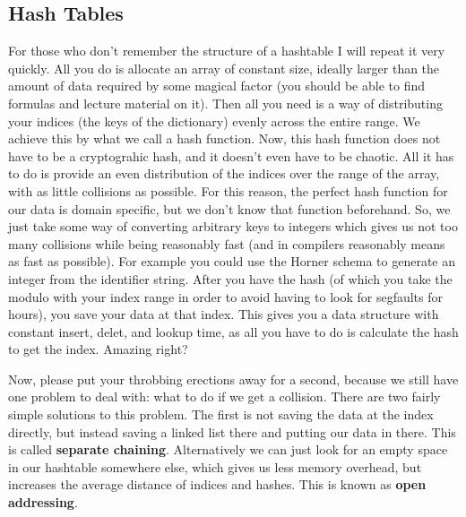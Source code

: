 \documentclass{article}
\begin{document}
\subsection{Hash Tables}
For those who don't remember the structure of a hashtable I will repeat it very quickly.
All you do is allocate an array of constant size, ideally larger than the amount of data required by some magical factor (you should be able to find formulas and lecture material on it).
Then all you need is a way of distributing your indices (the keys of the dictionary) evenly across the entire range.
We achieve this by what we call a hash function.
Now, this hash function does not have to be a cryptograhic hash, and it doesn't even have to be chaotic.
All it has to do is provide an even distribution of the indices over the range of the array, with as little collisions as possible.
For this reason, the perfect hash function for our data is domain specific, but we don't know that function beforehand.
So, we just take some way of converting arbitrary keys to integers which gives us not too many collisions while being reasonably fast (and in compilers reasonably means as fast as possible).
For example you could use the Horner schema to generate an integer from the identifier string.
After you have the hash (of which you take the modulo with your index range in order to avoid having to look for segfaults for hours), you save your data at that index.
This gives you a data structure with constant insert, delet, and lookup time, as all you have to do is calculate the hash to get the index.
Amazing right?

Now, please put your throbbing erections away for a second, because we still have one problem to deal with: what to do if we get a collision.
There are two fairly simple solutions to this problem.
The first is not saving the data at the index directly, but instead saving a linked list there and putting our data in there.
This is called \textbf{separate chaining}.
Alternatively we can just look for an empty space in our hashtable somewhere else, which gives us less memory overhead, but increases the average distance of indices and hashes.
This is known as \textbf{open addressing}.
\end{document}
